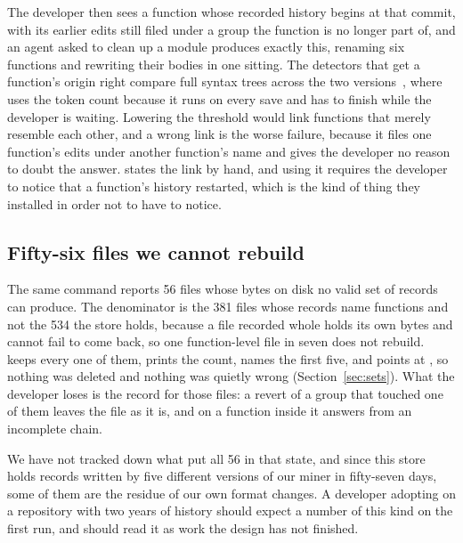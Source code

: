 The developer then sees a function whose recorded history begins at that commit, with
its earlier edits still filed under a group the function is no longer part of, and an
agent asked to clean up a module produces exactly this, renaming six functions and
rewriting their bodies in one sitting. The detectors that get a function's origin right
compare full syntax
trees across the two versions~\cite{godfrey2005,kim2005,falleri2014,tsantalis2018},
where \sgt{} uses the token count because it runs on every save and has to finish while
the developer is waiting. Lowering the threshold would link functions that merely
resemble each other, and a wrong link is the worse failure, because it files one
function's edits under another function's name and gives the developer no reason to
doubt the answer.  states the link by hand, and using
it requires the developer to notice that a function's history restarted, which is the
kind of thing they installed \sgt{} in order not to have to notice.

\subsection{Fifty-six files we cannot rebuild}
\label{sec:unreproducible}

The same command reports 56 files whose bytes on disk no valid set of records can
produce. The denominator is the 381 files whose records name functions and not the
534 the store holds, because a file recorded whole holds its own bytes and cannot
fail to come back, so one function-level file in seven does not rebuild.
\sgt{} keeps every one of them, prints the count, names the first five, and points at
, so nothing was deleted and nothing was quietly wrong
(Section~\ref{sec:sets}). What the developer loses is the record for those files: a
revert of a group that touched one of them leaves the file as it is, and 
on a function inside it answers from an incomplete chain.

We have not tracked down what put all 56 in that state, and since this store holds
records written by five different versions of our miner in fifty-seven days, some of
them are the residue of our own format changes. A developer adopting \sgt{} on a
repository with two years of history should expect a number of this kind on the first
run, and should read it as work the design has not finished.

